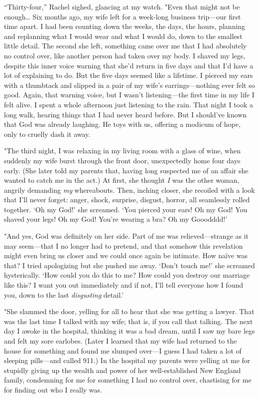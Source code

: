 ``Thirty-four,'' Rachel sighed, glancing at my watch. "Even that might
not be enough\ldots{} Six months ago, my wife left for a week-long
business trip---our first time apart. I had been counting down the
weeks, the days, the hours, planning and replanning what I would wear
and what I would do, down to the smallest little detail. The second she
left, something came over me that I had absolutely no control over, like
another person had taken over my body. I shaved my legs, despite this
inner voice warning that she'd return in five days and that I'd have a
lot of explaining to do. But the five days seemed like a lifetime. I
pierced my ears with a thumbtack and slipped in a pair of my wife's
earrings---nothing ever felt so good. Again, that warning voice, but I
wasn't listening---the first time in my life I felt alive. I spent a
whole afternoon just listening to the rain. That night I took a long
walk, hearing things that I had never heard before. But I should've
known that God was already laughing. He toys with us, offering a modicum
of hope, only to cruelly dash it away.

"The third night, I was relaxing in my living room with a glass of wine,
when suddenly my wife burst through the front door, unexpectedly home
four days early. (She later told my parents that, having long suspected
me of an affair she wanted to catch me in the act.) At first, she
thought \emph{I} was the other woman, angrily demanding \emph{my}
whereabouts. Then, inching closer, she recoiled with a look that I'll
never forget: anger, shock, surprise, disgust, horror, all seamlessly
rolled together. `Oh my God!' she screamed. `You pierced your ears! Oh
my God! You shaved your legs! Oh my God! You're wearing a bra? Oh my
Gooodddd!'

"And yes, God was definitely on her side. Part of me was
relieved---strange as it may seem---that I no longer had to pretend, and
that somehow this revelation might even bring us closer and we could
once again be intimate. How naïve was that? I tried apologizing but she
pushed me away. `Don't touch me!' she screamed hysterically. `How could
you do this to me? How could you destroy our marriage like this? I want
you out immediately and if not, I'll tell everyone how I found you, down
to the last \emph{disgusting} detail.'

"She slammed the door, yelling for all to hear that she was getting a
lawyer. That was the last time I talked with my wife; that is, if you
call that talking. The next day I awoke in the hospital, thinking it was
a bad dream, until I saw my bare legs and felt my sore earlobes. (Later
I learned that my wife had returned to the house for something and found
me slumped over---I guess I had taken a lot of sleeping pills---and
called 911.) In the hospital my parents were yelling at me for stupidly
giving up the wealth and power of her well-established New England
family, condemning for me for something I had no control over,
chastising for me for finding out who I really was.

